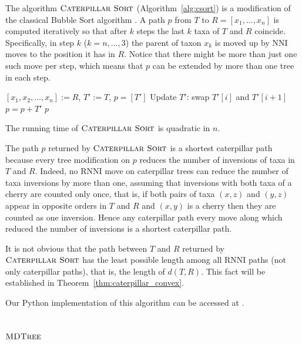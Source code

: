 \documentclass{amsart}
\newcommand{\nni}{\mathrm{NNI}}
\newcommand{\rnni}{\mathrm{RNNI}}
\newcommand{\csort}{\textsc{Caterpillar Sort}}
\newcommand{\mdtree}{\textsc{MDTree}}
\begin{document}
The algorithm $\csort$ (Algorithm~\ref{alg:csort}) is a modification of the classical Bubble Sort algorithm \autocite{Knuth1997-pi}.
A path $p$ from $T$ to $R= [x_1, \ldots, x_n]$ is computed iteratively so that after $k$ steps the last $k$ taxa of $T$ and $R$ coincide.
Specifically, in step $k$ ($k = n, \ldots, 3$) the parent of taxon $x_{k}$ is moved up by $\nni$ moves to the position it has in $R$.
Notice that there might be more than just one such move per step, which means that $p$ can be extended by more than one tree in each step.

\begin{algorithm}[H]
\caption{$\csort$($T,R$)}
\label{alg:csort}
\begin{algorithmic}[1]
\STATE $[x_1, x_2, \ldots, x_n] := R$, $T' := T$, $p = [T']$
            \STATE Update $T'$: swap $T'[i]$ and $T'[i+1]$
            \STATE $p = p + T'$
        \ENDIF
    \ENDFOR
\ENDFOR
\RETURN $p$
\end{algorithmic}
\end{algorithm}

The running time of $\csort$ is quadratic in $n$.

The path $p$ returned by $\csort$ is a shortest caterpillar path because every tree modification on $p$ reduces the number of inversions of taxa in $T$ and $R$.
Indeed, no $\rnni$ move on caterpillar trees can reduce the number of taxa inversions by more than one, assuming that inversions with both taxa of a cherry are counted only once, that is, if both pairs of taxa $(x, z)$ and $(y, z)$ appear in opposite orders in $T$ and $R$ and $(x,y)$ is a cherry then they are counted as one inversion.
Hence any caterpillar path every move along which reduced the number of inversions is a shortest caterpillar path.

It is not obvious that the path between $T$ and $R$ returned by $\csort$ has the least possible length among all $\rnni$ paths (not only caterpillar paths), that is, the length of $d(T, R)$.
This fact will be established in Theorem~\ref{thm:caterpillar_convex}.

Our Python implementation of this algorithm can be accessed at \autocite{Collienne2019}.


\subsection{$\mdtree$}
\label{section:alg_mdtree}
\end{document}
